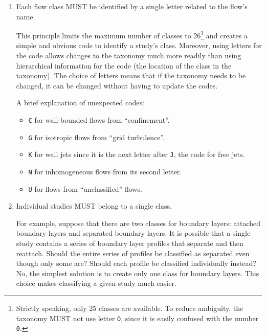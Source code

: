 \begin{enumerate}


\item
Each flow class MUST be identified by a single letter related to the flow's
name.

This principle limits the maximum number of classes to 26\footnote{
Strictly speaking, only 25 classes are available.  To reduce ambiguity, the
taxonomy MUST not use letter \texttt{O}, since it is easily confused with the
number \texttt{0}.
} and creates a simple and obvious code to identify a study's class.  Moreover,
using letters for the code allows changes to the taxonomy much more readily
than using hierarchical information for the code (the location of the class in
the taxonomy).  The choice of letters means that if the taxonomy needs to be
changed, it can be changed without having to update the codes.

A brief explanation of unexpected codes:

    \begin{itemize}

    \item
    \texttt{C} for wall-bounded flows from ``confinement''.

    \item
    \texttt{G} for isotropic flows from ``grid turbulence''.

    \item
    \texttt{K} for wall jets since it is the next letter after \texttt{J}, the
    code for free jets.

    \item
    \texttt{N} for inhomogeneous flows from its second letter.

    \item
    \texttt{U} for flows from ``unclassified'' flows.

    \end{itemize}


\item
Individual studies MUST belong to a single class.

For example, suppose that there are two classes for boundary layers: attached
boundary layers and separated boundary layers.  It is possible that a single
study contains a series of boundary layer profiles that separate and then
reattach.  Should the entire series of profiles be classified as separated even
though only some are?  Should each profile be classified individually instead?
No, the simplest solution is to create only one class for boundary layers.
This choice makes classifying a given study much easier.



\end{enumerate}

